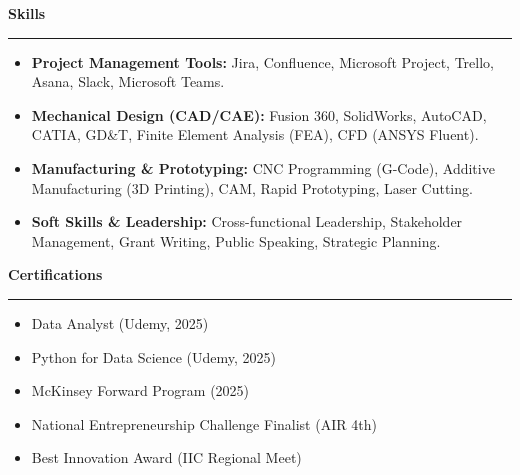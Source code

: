 \documentclass[9pt,letterpaper]{article} %
\newenvironment{rSection}[1]{ %
  \sectionskip
 \textbf{\Large #1} %
  \sectionlineskip
  \hrule %
  \begin{list}{}{ %
    \setlength{\leftmargin}{-0em} %
  }
  \item[]
}{
  \end{list}
}
\def\sectionlineskip{\smallskip} %
\def\sectionskip{} %
\begin{document}
\begin{rSection}{Skills}
\item[] \vspace{-0.5em}
\begin{itemize}[left=-1.5em, labelsep=.1cm, labelwidth=.2cm, itemsep=0.0em]

    \item \textbf{ Project Management Tools:} Jira, Confluence, Microsoft Project, Trello, Asana, Slack, Microsoft Teams.

    \item \textbf{ Mechanical Design (CAD/CAE):} Fusion 360, SolidWorks, AutoCAD, CATIA, GD\&T, Finite Element Analysis (FEA), CFD (ANSYS Fluent).

    \item \textbf{ Manufacturing \& Prototyping:} CNC Programming (G-Code), Additive Manufacturing (3D Printing), CAM, Rapid Prototyping, Laser Cutting.

    \item \textbf{ Soft Skills \& Leadership:} Cross-functional Leadership, Stakeholder Management, Grant Writing, Public Speaking, Strategic Planning.

\end{itemize}
\end{rSection}

\begin{rSection}{Certifications}
\item[] \vspace{-1em}
\begin{itemize}[left=-1.5em, labelsep=.1cm, labelwidth=.2cm, itemsep=0.0em]

\item Data Analyst (Udemy, 2025)

\item Python for Data Science (Udemy, 2025)

\item McKinsey Forward Program (2025)

\item National Entrepreneurship Challenge Finalist (AIR 4th)

\item Best Innovation Award (IIC Regional Meet)

\end{itemize}
\end{rSection}
\end{document}
